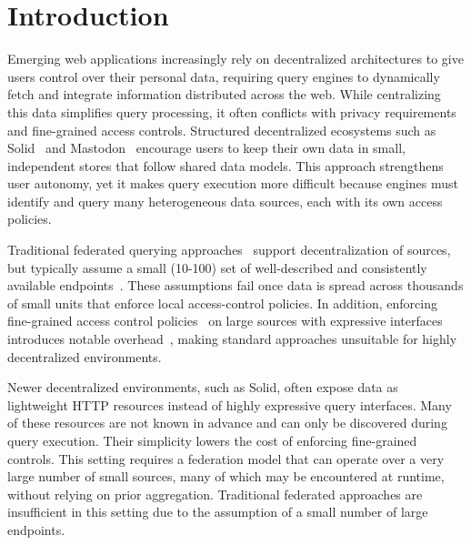 
\section{Introduction}
Emerging web applications increasingly rely on decentralized architectures to give users control over their personal data,
requiring query engines to dynamically fetch and integrate information distributed across the web.
While centralizing this data simplifies query processing, it often conflicts with privacy requirements 
and fine-grained access controls.
Structured decentralized ecosystems such as Solid~\cite{sambra2016solid} and Mastodon~\cite{raman2019challenges} encourage users to keep their own data in small,
independent stores that follow shared data models. 
This approach strengthens user autonomy, 
yet it makes query execution more difficult because engines must identify and query many heterogeneous data sources,
each with its own access policies.

Traditional federated querying approaches~\cite{schwarte2011fedx,schmidt2011fedbench,heling2022federated} support decentralization of sources,
but typically assume a small (10-100) set of well-described and consistently available endpoints~\cite{dang2023fedshop}. 
These assumptions fail once data is spread across thousands of small units that enforce local access-control policies.
In addition, enforcing fine-grained access control policies~\cite{esteves2021odrl} on large sources with expressive interfaces introduces notable 
overhead~\cite{padia2015attribute}, making standard approaches unsuitable for highly decentralized environments.

Newer decentralized environments, such as Solid, often expose data as \\lightweight HTTP resources
instead of highly expressive query interfaces. 
Many of these resources are not known in advance and can only be discovered during query execution. 
Their simplicity lowers the cost of enforcing fine-grained controls.
This setting requires a federation model that can operate over a very large number of small sources, many of which may be encountered at runtime, without relying on prior aggregation. 
Traditional federated approaches are insufficient in this setting due to the assumption of a small number of large endpoints.

